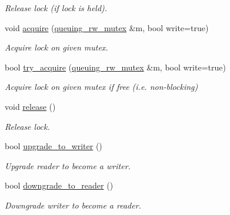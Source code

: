\begin{DoxyCompactItemize}
\begin{DoxyCompactList}\small\item\em Release lock (if lock is held). \end{DoxyCompactList}\item 
void \hyperlink{classtbb_1_1queuing__rw__mutex_1_1scoped__lock_ab4bf2fb86d6a418f9ea36474eb8893f9}{acquire} (\hyperlink{classtbb_1_1queuing__rw__mutex}{queuing\+\_\+rw\+\_\+mutex} \&m, bool write=true)
\begin{DoxyCompactList}\small\item\em Acquire lock on given mutex. \end{DoxyCompactList}\item 
bool \hyperlink{classtbb_1_1queuing__rw__mutex_1_1scoped__lock_a4843d40dddc37c1aa3444e27d35d2433}{try\+\_\+acquire} (\hyperlink{classtbb_1_1queuing__rw__mutex}{queuing\+\_\+rw\+\_\+mutex} \&m, bool write=true)
\begin{DoxyCompactList}\small\item\em Acquire lock on given mutex if free (i.\+e. non-\/blocking) \end{DoxyCompactList}\item 
void \hyperlink{classtbb_1_1queuing__rw__mutex_1_1scoped__lock_a50fb02b77f02a01c74754d163157ec77}{release} ()
\begin{DoxyCompactList}\small\item\em Release lock. \end{DoxyCompactList}\item 
bool \hyperlink{classtbb_1_1queuing__rw__mutex_1_1scoped__lock_ae0f28ecfbbc5f8b3024cd47048b72b5b}{upgrade\+\_\+to\+\_\+writer} ()
\begin{DoxyCompactList}\small\item\em Upgrade reader to become a writer. \end{DoxyCompactList}\item 
\hypertarget{classtbb_1_1queuing__rw__mutex_1_1scoped__lock_af0af63035147a3d8422f8c8d7b8d2629}{}bool \hyperlink{classtbb_1_1queuing__rw__mutex_1_1scoped__lock_af0af63035147a3d8422f8c8d7b8d2629}{downgrade\+\_\+to\+\_\+reader} ()\label{classtbb_1_1queuing__rw__mutex_1_1scoped__lock_af0af63035147a3d8422f8c8d7b8d2629}

\begin{DoxyCompactList}\small\item\em Downgrade writer to become a reader. \end{DoxyCompactList}\end{DoxyCompactItemize}


